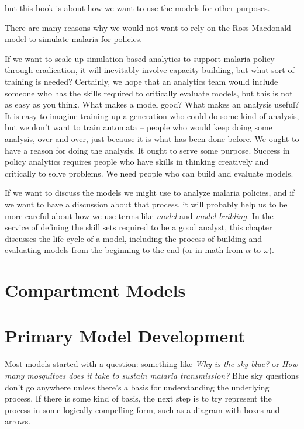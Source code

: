 \documentclass[
]{book}
\begin{document}
but this book is about how we want to use the models for other purposes.

There are many reasons why we would not want to rely on the Ross-Macdonald model to simulate malaria for policies.

If we want to scale up simulation-based analytics to support malaria policy through eradication, it will inevitably involve capacity building, but what sort of training is needed? Certainly, we hope that an analytics team would include someone who has the skills required to critically evaluate models, but this is not as easy as you think. What makes a model good? What makes an analysis useful? It is easy to imagine training up a generation who could do some kind of analysis, but we don't want to train automata -- people who would keep doing some analysis, over and over, just because it is what has been done before. We ought to have a reason for doing the analysis. It ought to serve some purpose. Success in policy analytics requires people who have skills in thinking creatively and critically to solve problems. We need people who can build and evaluate models.

If we want to discuss the models we might use to analyze malaria policies, and if we want to have a discussion about that process, it will probably help us to be more careful about how we use terms like \emph{model} and \emph{model building.} In the service of defining the skill sets required to be a good analyst, this chapter discusses the life-cycle of a model, including the process of building and evaluating models from the beginning to the end (or in math from \(\alpha\) to \(\omega\)).

\section{Compartment Models}\label{compartment-models}

\section{}\label{section}

\section{Primary Model Development}\label{primary-model-development}

Most models started with a question: something like \emph{Why is the sky blue?} or \emph{How many mosquitoes does it take to sustain malaria transmission?} Blue sky questions don't go anywhere unless there's a basis for understanding the underlying process. If there is some kind of basis, the next step is to try represent the process in some logically compelling form, such as a diagram with boxes and arrows.
\end{document}
